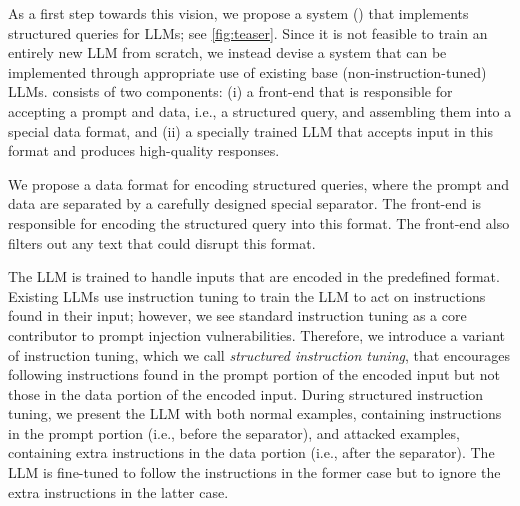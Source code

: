 As a first step towards this vision, we propose a system (\frameworkname) that implements structured queries for LLMs; see \cref{fig:teaser}.
Since it is not feasible to train an entirely new LLM from scratch, we instead devise a system that can be implemented through appropriate use of existing base (non-instruction-tuned) LLMs.
\frameworkname consists of two components: (i) a front-end that is responsible for accepting a prompt and data, i.e., a structured query, and assembling them into a special data format, and (ii) a specially trained LLM that accepts input in this format and produces high-quality responses.

We propose a data format for encoding structured queries, where the prompt and data are separated by a carefully designed special separator.
The front-end is responsible for encoding the structured query into this format. The front-end also filters out any text that could disrupt this format.

The LLM is trained to handle inputs that are encoded in the predefined format.
Existing LLMs use instruction tuning to train the LLM to act on instructions found in their input;
however, we see standard instruction tuning as a core contributor to 
prompt injection vulnerabilities.
Therefore, we introduce a variant of instruction tuning, which we call \emph{structured instruction tuning}, that encourages following instructions found in the prompt portion of the encoded input but not those in the data portion of the encoded input.
During structured instruction tuning, we present the LLM with both normal examples, containing instructions in the prompt portion (i.e., before the separator), and attacked examples, containing extra instructions in the data portion (i.e., after the separator).
The LLM is fine-tuned to follow the instructions in the former case but to ignore the extra instructions in the latter case.


